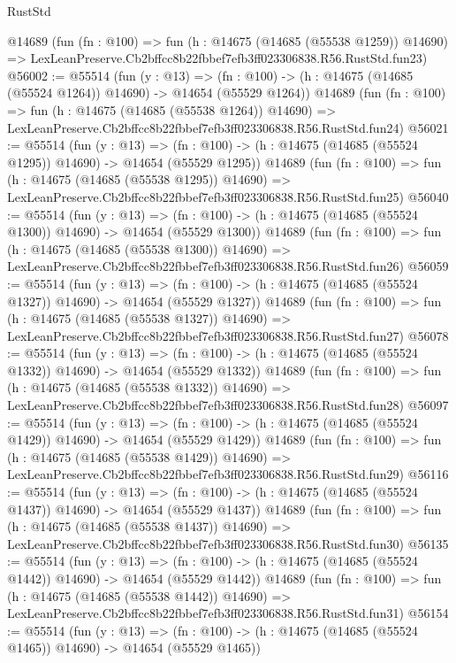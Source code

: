\begin{lexlean}{RustStd}
\begin{coremodule}
    @14689
    (fun (fn : @100) =>
    fun (h : @14675 (@14685 (@55538 @1259)) @14690) =>
    LexLeanPreserve.Cb2bffcc8b22fbbef7efb3ff023306838.R56.RustStd.fun23)
@56002 := @55514
    (fun (y : @13) =>
    (fn : @100) -> (h : @14675 (@14685 (@55524 @1264)) @14690) -> @14654 (@55529 @1264))
    @14689
    (fun (fn : @100) =>
    fun (h : @14675 (@14685 (@55538 @1264)) @14690) =>
    LexLeanPreserve.Cb2bffcc8b22fbbef7efb3ff023306838.R56.RustStd.fun24)
@56021 := @55514
    (fun (y : @13) =>
    (fn : @100) -> (h : @14675 (@14685 (@55524 @1295)) @14690) -> @14654 (@55529 @1295))
    @14689
    (fun (fn : @100) =>
    fun (h : @14675 (@14685 (@55538 @1295)) @14690) =>
    LexLeanPreserve.Cb2bffcc8b22fbbef7efb3ff023306838.R56.RustStd.fun25)
@56040 := @55514
    (fun (y : @13) =>
    (fn : @100) -> (h : @14675 (@14685 (@55524 @1300)) @14690) -> @14654 (@55529 @1300))
    @14689
    (fun (fn : @100) =>
    fun (h : @14675 (@14685 (@55538 @1300)) @14690) =>
    LexLeanPreserve.Cb2bffcc8b22fbbef7efb3ff023306838.R56.RustStd.fun26)
@56059 := @55514
    (fun (y : @13) =>
    (fn : @100) -> (h : @14675 (@14685 (@55524 @1327)) @14690) -> @14654 (@55529 @1327))
    @14689
    (fun (fn : @100) =>
    fun (h : @14675 (@14685 (@55538 @1327)) @14690) =>
    LexLeanPreserve.Cb2bffcc8b22fbbef7efb3ff023306838.R56.RustStd.fun27)
@56078 := @55514
    (fun (y : @13) =>
    (fn : @100) -> (h : @14675 (@14685 (@55524 @1332)) @14690) -> @14654 (@55529 @1332))
    @14689
    (fun (fn : @100) =>
    fun (h : @14675 (@14685 (@55538 @1332)) @14690) =>
    LexLeanPreserve.Cb2bffcc8b22fbbef7efb3ff023306838.R56.RustStd.fun28)
@56097 := @55514
    (fun (y : @13) =>
    (fn : @100) -> (h : @14675 (@14685 (@55524 @1429)) @14690) -> @14654 (@55529 @1429))
    @14689
    (fun (fn : @100) =>
    fun (h : @14675 (@14685 (@55538 @1429)) @14690) =>
    LexLeanPreserve.Cb2bffcc8b22fbbef7efb3ff023306838.R56.RustStd.fun29)
@56116 := @55514
    (fun (y : @13) =>
    (fn : @100) -> (h : @14675 (@14685 (@55524 @1437)) @14690) -> @14654 (@55529 @1437))
    @14689
    (fun (fn : @100) =>
    fun (h : @14675 (@14685 (@55538 @1437)) @14690) =>
    LexLeanPreserve.Cb2bffcc8b22fbbef7efb3ff023306838.R56.RustStd.fun30)
@56135 := @55514
    (fun (y : @13) =>
    (fn : @100) -> (h : @14675 (@14685 (@55524 @1442)) @14690) -> @14654 (@55529 @1442))
    @14689
    (fun (fn : @100) =>
    fun (h : @14675 (@14685 (@55538 @1442)) @14690) =>
    LexLeanPreserve.Cb2bffcc8b22fbbef7efb3ff023306838.R56.RustStd.fun31)
@56154 := @55514
    (fun (y : @13) =>
    (fn : @100) -> (h : @14675 (@14685 (@55524 @1465)) @14690) -> @14654 (@55529 @1465))

\end{coremodule}
\end{lexlean}
